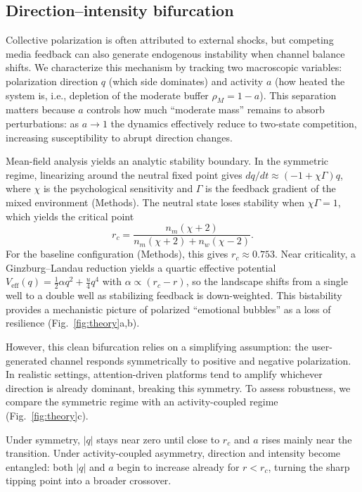 \documentclass[11pt]{article}
\begin{document}
\subsection{Direction--intensity bifurcation}
\label{sec:direction-intensity-bifurcation}
Collective polarization is often attributed to external shocks, but competing media feedback can also generate endogenous instability when channel balance shifts. We characterize this mechanism by tracking two macroscopic variables: polarization direction $q$ (which side dominates) and activity $a$ (how heated the system is, i.e., depletion of the moderate buffer $\rho_M=1-a$). This separation matters because $a$ controls how much ``moderate mass'' remains to absorb perturbations: as $a\to 1$ the dynamics effectively reduce to two-state competition, increasing susceptibility to abrupt direction changes.

Mean-field analysis yields an analytic stability boundary. In the symmetric regime, linearizing around the neutral fixed point gives $dq/dt\approx(-1+\chi\Gamma)q$, where $\chi$ is the psychological sensitivity and $\Gamma$ is the feedback gradient of the mixed environment (Methods). The neutral state loses stability when $\chi\Gamma=1$, which yields the critical point
\begin{equation}
r_c=\frac{n_m(\chi+2)}{n_m(\chi+2)+n_w(\chi-2)}.
\label{eq:rc}
\end{equation}
For the baseline configuration (Methods), this gives $r_c\approx 0.753$. Near criticality, a Ginzburg--Landau reduction yields a quartic effective potential $V_{\text{eff}}(q)=\tfrac{1}{2}\alpha q^2+\tfrac{u}{4}q^4$ with $\alpha\propto(r_c-r)$, so the landscape shifts from a single well to a double well as stabilizing feedback is down-weighted. This bistability provides a mechanistic picture of polarized ``emotional bubbles'' as a loss of resilience (Fig.~\ref{fig:theory}a,b).

However, this clean bifurcation relies on a simplifying assumption: the user-generated channel responds symmetrically to positive and negative polarization. In realistic settings, attention-driven platforms tend to amplify whichever direction is already dominant, breaking this symmetry. To assess robustness, we compare the symmetric regime with an activity-coupled regime (Fig.~\ref{fig:theory}c).

Under symmetry, $|q|$ stays near zero until close to $r_c$ and $a$ rises mainly near the transition. Under activity-coupled asymmetry, direction and intensity become entangled: both $|q|$ and $a$ begin to increase already for $r<r_c$, turning the sharp tipping point into a broader crossover.
\end{document}
